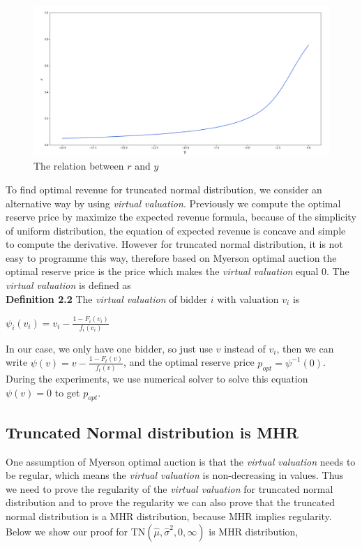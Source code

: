 \begin{figure}[H]
	\centering
	\includegraphics[width=1\textwidth]{tnorm_r}
	\caption{The relation between $r$ and $y$}
	\label{fig:tnorm_r}
\end{figure}
To find optimal revenue for truncated normal distribution, we consider an alternative way by using \textit{virtual valuation}. Previously we compute the optimal reserve price by maximize the expected revenue formula, because of the simplicity of uniform distribution, the equation of expected revenue is concave and simple to compute the derivative. However for truncated normal distribution, it is not easy to programme this way, therefore based on Myerson optimal auction the optimal reserve price is the price which makes the \textit{virtual valuation} equal 0. The \textit{virtual valuation} is defined as\\
\textbf{Definition 2.2} The \textit{virtual valuation} of bidder $i$ with valuation $v_i$ is 
\begin{center}
	$\psi_i(v_i) = v_i - \frac{1-F_i(v_i)}{f_i(v_i)}$ 
\end{center}
In our case, we only have one bidder, so just use $v$ instead of $v_i$, then we can write $\psi(v) = v - \frac{1-F_t (v)}{f_t (v)}$, and the optimal reserve price $p_{opt} = \psi^{-1}(0)$. During the experiments, we use numerical solver to solve this equation $\psi(v) = 0$ to get $p_{opt}$.\\

\subsection{Truncated Normal distribution is MHR}
One assumption of Myerson optimal auction is that the \textit{virtual valuation} needs to be regular, which means the \textit{virtual valuation} is non-decreasing in values. Thus we need to prove the regularity of the \textit{virtual valuation} for truncated normal distribution and to prove the regularity we can also prove that the truncated normal distribution is a MHR distribution, because MHR implies regularity. Below we show our proof for TN$(\hat{\mu}, \hat{\sigma}^2, 0, \infty)$ is MHR distribution,

